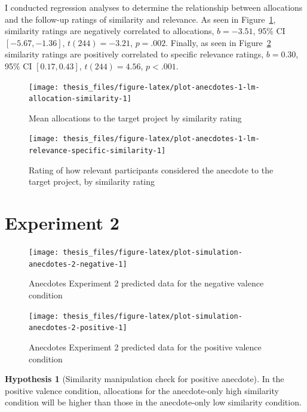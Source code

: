 \documentclass[a4paper, nobind, dvipsnames]{templates/ociamthesis}
\theoremstyle{definition}
\theoremstyle{definition}
\theoremstyle{definition}
\theoremstyle{definition}
\newtheorem{hypothesis}{Hypothesis}[chapter]
\theoremstyle{remark}
\begin{document}
I conducted regression analyses to determine the relationship between
allocations and the follow-up ratings of similarity and relevance. As seen in
Figure~\ref{fig:plot-anecdotes-1-lm-allocation-similarity}, similarity ratings
are negatively correlated to allocations,
\(b = -3.51\), 95\% CI \([-5.67, -1.36]\), \(t(244) = -3.21\), \(p = .002\). Finally, as seen in
Figure~\ref{fig:plot-anecdotes-1-lm-relevance-specific-similarity} similarity
ratings are positively correlated to specific relevance ratings,
\(b = 0.30\), 95\% CI \([0.17, 0.43]\), \(t(244) = 4.56\), \(p < .001\).



\begin{figure}
\texttt{[image: thesis\_files/figure-latex/plot-anecdotes-1-lm-allocation-similarity-1]} \caption{Mean allocations to the target project by similarity rating}\label{fig:plot-anecdotes-1-lm-allocation-similarity}
\end{figure}



\begin{figure}
\texttt{[image: thesis\_files/figure-latex/plot-anecdotes-1-lm-relevance-specific-similarity-1]} \caption{Rating of how relevant participants considered the anecdote to the target project, by similarity rating}\label{fig:plot-anecdotes-1-lm-relevance-specific-similarity}
\end{figure}

\hypertarget{anecdotes-2-appendix}{%
\section{Experiment 2}\label{anecdotes-2-appendix}}



\begin{figure}
\texttt{[image: thesis\_files/figure-latex/plot-simulation-anecdotes-2-negative-1]} \caption{Anecdotes Experiment 2 predicted data for the negative valence condition}\label{fig:plot-simulation-anecdotes-2-negative}
\end{figure}



\begin{figure}
\texttt{[image: thesis\_files/figure-latex/plot-simulation-anecdotes-2-positive-1]} \caption{Anecdotes Experiment 2 predicted data for the positive valence condition}\label{fig:plot-simulation-anecdotes-2-positive}
\end{figure}

\begin{hypothesis}[Similarity manipulation check for positive anecdote]
\protect\hypertarget{hyp:similarity-check-anecdotes-2}{}{\label{hyp:similarity-check-anecdotes-2} {} }In the positive valence condition, allocations for the anecdote-only high
similarity condition will be higher than those in the anecdote-only low
similarity condition.
\end{hypothesis}
\end{document}
